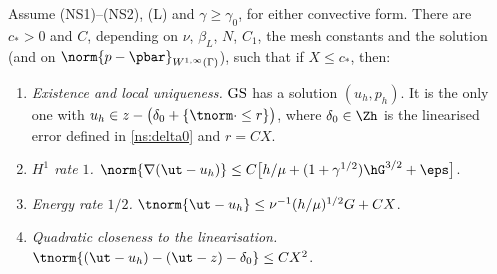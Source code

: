 \begin{theorem}\label{ns:thmGS}
Assume (NS1)--(NS2), (L) and $\gamma\ge\gamma_0$, for either convective form. There are $c_\ast>0$ and $C$, depending on $\nu$, $\beta_L$, $N$, $C_1$, the mesh constants and the solution (and on $\norm{p-\pbar}_{W^{1,\infty}(\Gamma)}$), such that if $X\le c_\ast$, then:
\begin{enumerate}[label=(\alph*)]
\item \emph{Existence and local uniqueness.} $\mathrm{GS}$ has a solution $(u_h,p_h)$. It is the only one with $u_h\in z-\bigl(\delta_0+\{\tnorm\cdot\le r\}\bigr)$, where $\delta_0\in\Zh$ is the linearised error defined in \eqref{ns:delta0} and $r=CX$.
\item \emph{$H^1$ rate $1$.} $\norm{\nabla(\ut-u_h)}\le C\bigl[h/\mu+(1+\gamma^{1/2})\hG^{3/2}+\eps\bigr]$.
\item \emph{Energy rate $1/2$.} $\tnorm{\ut-u_h}\le\nu^{-1}(h/\mu)^{1/2}G+CX$.
\item \emph{Quadratic closeness to the linearisation.} $\tnorm{(\ut-u_h)-(\ut-z)-\delta_0}\le CX^2$.
\end{enumerate}
\end{theorem}

